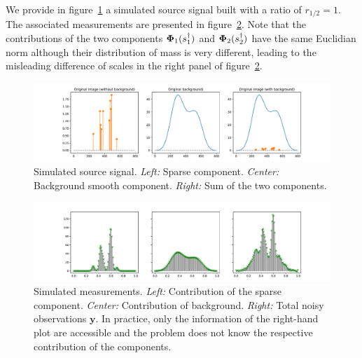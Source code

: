             We provide in figure~\ref{fig:simple:source} a simulated source signal built with a ratio of $r_{1/2} = 1$. 
            The associated measurements are presented in figure~\ref{fig:simple:measurements}. Note that the contributions of the two components ${\bm{\Phi}_1}(s_1^\dagger)$ and ${\bm{\Phi}_2}(s_2^\dagger)$ have the same Euclidian norm although their distribution of mass is very different, leading to the misleading difference of scales in the right panel of figure~\ref{fig:simple:measurements}. %
    
            \begin{figure}[t]
                \centering
                \includegraphics[width=\linewidth]{figures/simple_reco/gt.pdf}        
                \caption{Simulated source signal. \textit{Left:} Sparse component. \textit{Center:} Background smooth component. \textit{Right:} Sum of the two components.}
                \label{fig:simple:source}
            \end{figure}
        
            \begin{figure}[t]
                \centering
                \includegraphics[width=\linewidth]{figures/simple_reco/measurements.pdf}        
                \caption{Simulated measurements. \textit{Left:} Contribution of the sparse component. \textit{Center:} Contribution of background. \textit{Right:} Total noisy observations $\bm{y}$. In practice, only the information of the right-hand plot are accessible and the problem does not know the respective contribution of the components.}
                \label{fig:simple:measurements}
            \end{figure}

